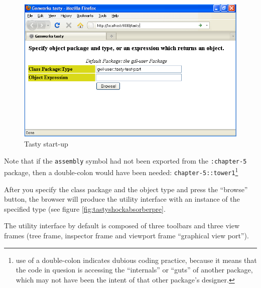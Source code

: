 \documentclass [11pt]{book}
\begin{document}
\begin{figure}
\begin{center}
\includegraphics{../images/tasty-start.png}
\end{center}

\caption{Tasty start-up}

\label{fig:tasty-startup}

\end{figure}


Note that if the \texttt{assembly} symbol had not been exported from the \texttt{:chapter-5} package, then a double-colon would have been needed: \texttt{chapter-5::tower1}\footnote{use of a double-colon indicates dubious coding
practice, because it means that the code in quesion is accessing the
``internals'' or ``guts'' of another package, which may not have been
the intent of that other package's designer.}



After you specify the class package and the object type and press the
``browse'' button, the browser will produce the utility interface
with an instance of the specified type (see figure 
\ref{fig:tastyshockabsorberpre}.



The utility interface by default is composed of three toolbars and
three view frames (tree frame, inspector frame and viewport frame
``graphical view port'').
\end{document}
